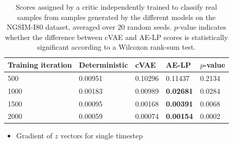 \documentclass{article}
\begin{document}
\begin{table}
  \caption{Scores assigned by a critic independently trained to classify real samples from samples generated by the different models on the NGSIM-I80 dataset, averaged over 20 random seeds. $p$-value indicates whether the difference between cVAE and AE-LP scores is statistically significant according to a Wilcoxon rank-sum test.}
  \label{critic-table}
  \centering
  \begin{tabular}{l|l|lll}
    \toprule
    Training iteration     & Deterministic & cVAE & AE-LP & $p$-value \\
    \midrule
    500 & 0.00951 & 0.10296 & 0.11437 & 0.2134 \\
    1000 & 0.00183 & 0.00989 & \textbf{0.02681} & 0.0284 \\
    1500 & 0.00095 & 0.00168 & \textbf{0.00391} & 0.0068 \\
    2000 & 0.00059 & 0.00074 & \textbf{0.00154} & 0.0002 \\
    \bottomrule
  \end{tabular}
\end{table}






\begin{itemize}
\item Gradient of $z$ vectors for single timestep
\end{itemize}
\end{document}
